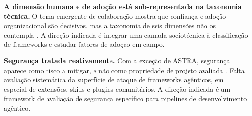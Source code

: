 \noindent\textbf{A dimensão humana e de adoção está sub-representada na taxonomia técnica.} O tema emergente de colaboração mostra que confiança e adoção organizacional são decisivos, mas a taxonomia de seis dimensões não os contempla \cite{DanielRusso2024,Ulfsnes2024,Baron2025,Akbar2025}. A direção indicada é integrar uma camada sociotécnica à classificação de frameworks e estudar fatores de adoção em campo.

\noindent\textbf{Segurança tratada reativamente.} Com a exceção de ASTRA, segurança aparece como risco a mitigar, e não como propriedade de projeto avaliada \cite{XiangzheXu2025}. Falta avaliação sistemática da superfície de ataque de frameworks agênticos, em especial de extensões, skills e plugins comunitários. A direção indicada é um framework de avaliação de segurança específico para pipelines de desenvolvimento agêntico.
